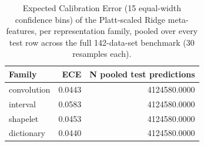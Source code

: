 \begin{table}[t]
\centering
\begin{tabular}{lrr}
\toprule
Family & ECE & N pooled test predictions \\
\midrule
convolution & 0.0443 & 4124580.0000 \\
interval & 0.0583 & 4124580.0000 \\
shapelet & 0.0453 & 4124580.0000 \\
dictionary & 0.0440 & 4124580.0000 \\
\bottomrule
\end{tabular}
\caption{Expected Calibration Error (15 equal-width confidence bins) of the Platt-scaled Ridge meta-features, per representation family, pooled over every test row across the full 142-data-set benchmark (30 resamples each).}
\label{tab:ridge-calibration-ece}
\end{table}